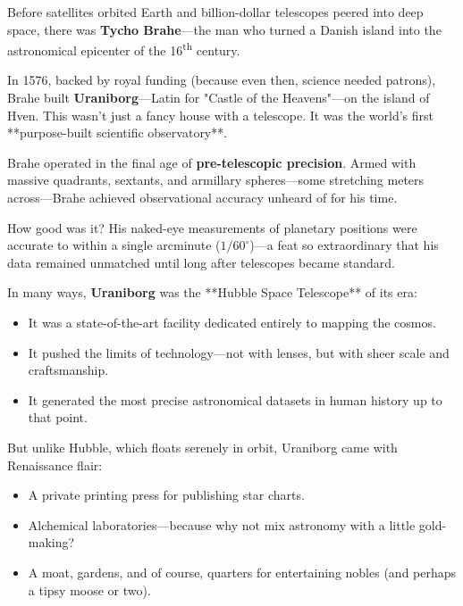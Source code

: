 \begin{tcolorbox}[colback=blue!5!white, colframe=blue!50!black, title={Historical Sidebar: Tycho Brahe’s Uraniborg — The Hubble of the Renaissance}, breakable]

  Before satellites orbited Earth and billion-dollar telescopes peered into deep space, there was \textbf{Tycho Brahe}—the man who turned a Danish island into the astronomical epicenter of the 16\textsuperscript{th} century.

  \medskip
  
  In 1576, backed by royal funding (because even then, science needed patrons), Brahe built \textbf{Uraniborg}—Latin for "Castle of the Heavens"—on the island of Hven. This wasn’t just a fancy house with a telescope. It was the world’s first **purpose-built scientific observatory**.
  
  \medskip
  
  Brahe operated in the final age of \textbf{pre-telescopic precision}. Armed with massive quadrants, sextants, and armillary spheres—some stretching meters across—Brahe achieved observational accuracy unheard of for his time.

  \medskip
  
  How good was it?  His naked-eye measurements of planetary positions were accurate to within a single arcminute (\(1/60^\circ\))—a feat so extraordinary that his data remained unmatched until long after telescopes became standard.
  
  \medskip
  
  In many ways, \textbf{Uraniborg} was the **Hubble Space Telescope** of its era:

  \medskip
  
  \begin{itemize}
    \item It was a state-of-the-art facility dedicated entirely to mapping the cosmos.
    \item It pushed the limits of technology—not with lenses, but with sheer scale and craftsmanship.
    \item It generated the most precise astronomical datasets in human history up to that point.
  \end{itemize}

  \medskip
  
  But unlike Hubble, which floats serenely in orbit, Uraniborg came with Renaissance flair:

  \medskip
  
  \begin{itemize}
    \item A private printing press for publishing star charts.
    \item Alchemical laboratories—because why not mix astronomy with a little gold-making?
    \item A moat, gardens, and of course, quarters for entertaining nobles (and perhaps a tipsy moose or two).
  \end{itemize}
  

\end{tcolorbox}
